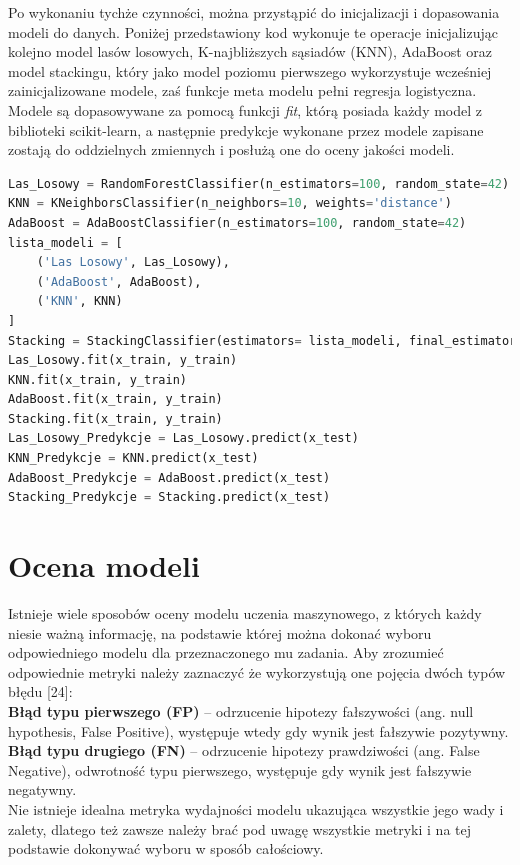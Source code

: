 \documentclass[a4paper,12pt,oneside]{book}
\begin{document}
Po wykonaniu tychże czynności, można przystąpić do inicjalizacji i dopasowania modeli do danych. Poniżej przedstawiony kod wykonuje te operacje inicjalizując kolejno model lasów losowych, K-najbliższych sąsiadów (KNN), AdaBoost oraz model stackingu, który jako model poziomu pierwszego wykorzystuje wcześniej zainicjalizowane modele, zaś funkcje meta modelu pełni regresja logistyczna. Modele są dopasowywane za pomocą funkcji \textit{fit}, którą posiada każdy model z biblioteki scikit-learn, a następnie predykcje wykonane przez modele zapisane zostają do oddzielnych zmiennych i posłużą one do oceny jakości modeli.

\newpage

\begin{lstlisting}[language=Python, caption=Dopasowanie modeli]
Las_Losowy = RandomForestClassifier(n_estimators=100, random_state=42)
KNN = KNeighborsClassifier(n_neighbors=10, weights='distance')
AdaBoost = AdaBoostClassifier(n_estimators=100, random_state=42)   
lista_modeli = [
    ('Las Losowy', Las_Losowy),
    ('AdaBoost', AdaBoost),
    ('KNN', KNN)
]
Stacking = StackingClassifier(estimators= lista_modeli, final_estimator=LogisticRegression())
Las_Losowy.fit(x_train, y_train)
KNN.fit(x_train, y_train)
AdaBoost.fit(x_train, y_train)
Stacking.fit(x_train, y_train)
Las_Losowy_Predykcje = Las_Losowy.predict(x_test)
KNN_Predykcje = KNN.predict(x_test)
AdaBoost_Predykcje = AdaBoost.predict(x_test)
Stacking_Predykcje = Stacking.predict(x_test)
\end{lstlisting}


\chapter{Ocena modeli}
Istnieje wiele sposobów oceny modelu uczenia maszynowego, z których każdy niesie ważną informację, na podstawie której można dokonać wyboru odpowiedniego modelu dla przeznaczonego mu zadania. Aby zrozumieć odpowiednie metryki należy zaznaczyć że wykorzystują one pojęcia dwóch typów błędu [24]:\\
\textbf{Błąd typu pierwszego (FP)} – odrzucenie hipotezy fałszywości (ang. null hypothesis, False Positive), występuje wtedy gdy wynik jest fałszywie pozytywny.\\
\textbf{Błąd typu drugiego (FN)} – odrzucenie hipotezy prawdziwości (ang. False Negative), odwrotność typu pierwszego, występuje gdy wynik jest fałszywie negatywny.\\
Nie istnieje idealna metryka wydajności modelu ukazująca wszystkie jego wady i zalety, dlatego też zawsze należy brać pod uwagę wszystkie metryki i na tej podstawie dokonywać wyboru w sposób całościowy.
\end{document}
